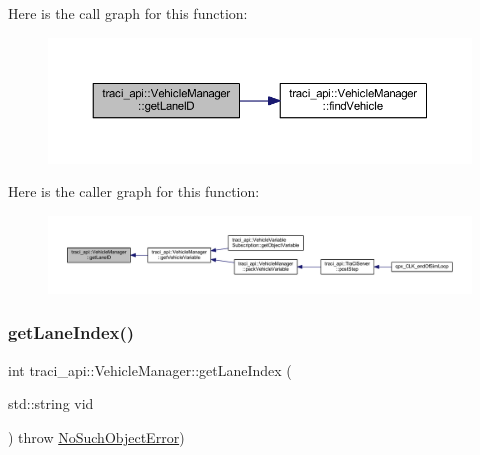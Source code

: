 Here is the call graph for this function\+:\nopagebreak
\begin{figure}[H]
\begin{center}
\leavevmode
\includegraphics[width=350pt]{classtraci__api_1_1_vehicle_manager_a5cf2db6460fa94ccb2b3d489369b7d0e_cgraph}
\end{center}
\end{figure}
Here is the caller graph for this function\+:\nopagebreak
\begin{figure}[H]
\begin{center}
\leavevmode
\includegraphics[width=350pt]{classtraci__api_1_1_vehicle_manager_a5cf2db6460fa94ccb2b3d489369b7d0e_icgraph}
\end{center}
\end{figure}
\mbox{\label{classtraci__api_1_1_vehicle_manager_a8daaf314dfb440dfb48575b072cd0d41}} 
\subsubsection{\texorpdfstring{get\+Lane\+Index()}{getLaneIndex()}}
{\footnotesize\ttfamily int traci\+\_\+api\+::\+Vehicle\+Manager\+::get\+Lane\+Index (\begin{DoxyParamCaption}\item[{std\+::string}]{vid }\end{DoxyParamCaption}) throw  \hyperlink{classtraci__api_1_1_no_such_object_error}{No\+Such\+Object\+Error}) }

